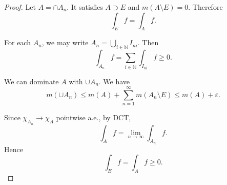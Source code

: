 \begin{itemize}
\begin{proof}
	 Let $A = \cap A_n$. It satisfies $A \supset E$ and $m(A \setminus E)  = 0$. Therefore
	 \[
	 	\int _E f = \int _A f
	 .\] 
	 
	 For each $A_n$, we may write $A_n = \bigcup_{i \in \mathbb{N}} I_{ni}$. Then
	 \[
	 	\int _{A_n} f = \sum_{i \in \mathbb{N}} \int _{I_{ni}} f \ge 0
	 .\] 

	 We can dominate $A $ with $\cup A_n$. We have
	 \[
	 	m\left( \cup A_n \right) \le m(A) + \sum_{n=1}^{\infty} m(A_n \setminus E) \le m(A) + \varepsilon
	 .\] 

	 Since $\chi_{A_n} \to \chi_A$ pointwise a.e., by DCT,
	 \[
	 	\int _A f = \lim_{n \to \infty}  \int_{A_n} f
	 .\] 
	 Hence
	 \[
	 	\int _E f = \int _A f \ge 0
	 .\] 
\end{proof}

\end{itemize}
